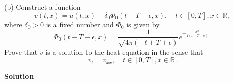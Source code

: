 \documentclass{article}
\begin{document}
\vspace{5mm}

(b) Construct a function
%
\begin{equation*}
    v(t, x) = u(t, x) - \delta_0 \Phi_0(t - T - \epsilon, x),
    \quad t \in [0, T], x \in \mathbb{R}
    ,
\end{equation*}
%
where $\delta_0 > 0$ is a fixed number and $\Phi_0$ is given by
%
\begin{equation*}
    \Phi_0(t - T - \epsilon, x)
        = \frac{1}{\sqrt{4 \pi (- t + T + \epsilon)}}
            e^{- \frac{x^2}{4 (t - T - \epsilon)}}
        .
\end{equation*}
%
Prove that $v$ is a solution to the heat equation in the sense that
%
\begin{equation*}
    v_t = v_{xx},
    \quad t \in [0, T], x \in \mathbb{R}
    .
\end{equation*}

\textbf{Solution}
\end{document}
